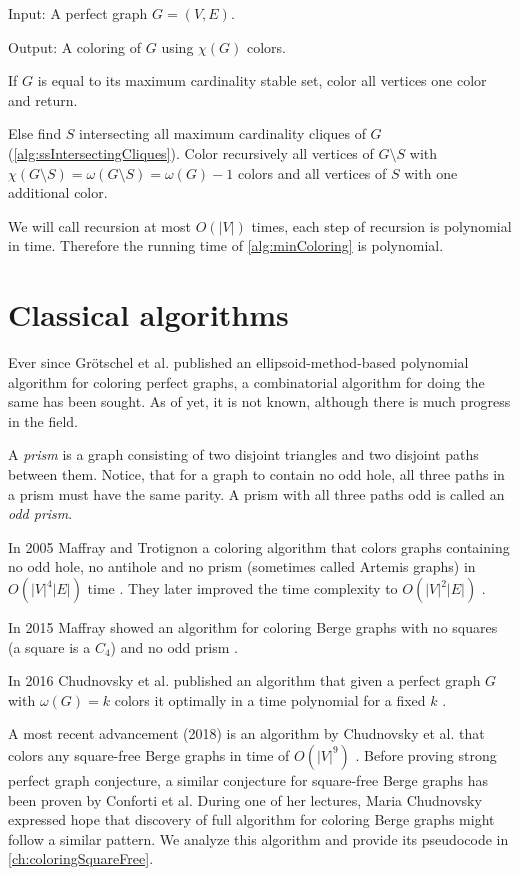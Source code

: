\begin{alg}
  \label{alg:minColoring}
  Input: A perfect graph $G = (V, E)$.

  \noindent Output: A coloring of $G$ using $\chi(G)$ colors.
\end{alg}
\begin{algtext2}
  If $G$ is equal to its maximum cardinality stable set, color all vertices one color and return.

  Else find $S$ intersecting all maximum cardinality cliques of $G$ (\cref{alg:ssIntersectingCliques}). Color recursively all vertices of $G \setminus S$ with $\chi(G \setminus S) = \omega(G \setminus S) = \omega(G) -1$ colors and all vertices of $S$ with one additional color.
\end{algtext2}

We will call recursion at most $O(|V|)$ times, each step of recursion is polynomial in time. Therefore the running time of \cref{alg:minColoring} is polynomial.

\section{Classical algorithms}
\label{sec:classicalColoring}

Ever since Grötschel et al. published an ellipsoid-method-based polynomial algorithm for coloring perfect graphs, a combinatorial algorithm for doing the same has been sought. As of yet, it is not known, although there is much progress in the field.

A \emph{prism} is a graph consisting of two disjoint triangles and two disjoint paths between them. Notice, that for a graph to contain no odd hole, all three paths in a prism must have the same parity. A prism with all three paths odd is called an \emph{odd prism}.

In 2005 Maffray and Trotignon a coloring algorithm that colors graphs containing no odd hole, no antihole and no prism (sometimes called Artemis graphs) in $O(|V|^4|E|)$ time \cite{Maffray2006}. They later improved the time complexity to $O(|V|^2|E|)$ \cite{Lvque2009}.

In 2015 Maffray showed an algorithm for coloring Berge graphs with no squares (a square is a $C_4$) and no odd prism \cite{Maff2015}.

In 2016 Chudnovsky et al. published an algorithm that given a perfect graph $G$ with $\omega(G) = k$ colors it optimally in a time polynomial for a fixed $k$ \cite{Chudnovsky2017}.

A most recent advancement (2018) is an algorithm by Chudnovsky et al. that colors any square-free Berge graphs in time of $O(|V|^9)$ \cite{Chudnovsky2019}. Before proving strong perfect graph conjecture, a similar conjecture for square-free Berge graphs has been proven by Conforti et al. \cite{Conforti2004} During one of her lectures, Maria Chudnovsky expressed hope that discovery of full algorithm for coloring Berge graphs might follow a similar pattern. We analyze this algorithm and provide its pseudocode in \cref{ch:coloringSquareFree}.

